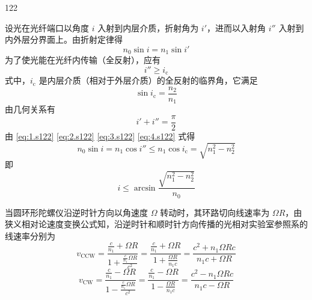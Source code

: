 \begin{solution}{122}
    \begin{subsolution}
        设光在光纤端口以角度 $i$ 入射到内层介质，折射角为 $i'$，进而以入射角 $i''$ 入射到内外层分界面上。由折射定律得
        \begin{equation}
            n_{0} \sin i = n_{1} \sin i'
            \label{eq:1.s122}
        \end{equation}
        为了使光能在光纤内传输（全反射），应有
        \begin{equation}
            i'' \geq i_{\mathrm{c}}
            \label{eq:2.s122}
        \end{equation}
        式中，$i_{\mathrm{c}}$ 是内层介质（相对于外层介质）的全反射的临界角，它满足
        \begin{equation}
            \sin i_{\mathrm{c}} = \frac{n_{2}}{n_{1}}
            \label{eq:3.s122}
        \end{equation}
        由几何关系有
        \begin{equation}
            i' + i'' = \frac{\pi}{2}
            \label{eq:4.s122}
        \end{equation}
        由 \eqref{eq:1.s122} \eqref{eq:2.s122} \eqref{eq:3.s122} \eqref{eq:4.s122} 式得
        \begin{equation}
            n_{0} \sin i = n_{1} \cos i'' \leq n_{1} \cos i_{\mathrm{c}} = \sqrt{n_{1}^{2} - n_{2}^{2}}
        \end{equation}
        即
        \begin{equation}
            i \leq \arcsin \frac{\sqrt{n_{1}^{2} - n_{2}^{2}}}{n_{0}}
            \label{eq:5.s122}
        \end{equation}
    \end{subsolution}
    \begin{subsolution}
        当圆环形陀螺仪沿逆时针方向以角速度 $\Omega$ 转动时，其环路切向线速率为 $\Omega R$，由狭义相对论速度变换公式知，沿逆时针和顺时针方向传播的光相对实验室参照系的线速率分别为
        \begin{equation}
            v_{\mathrm{CCW}} = \frac{\frac{c}{n_{1}} + \Omega R}{1 + \frac{\frac{c}{n_{1}} \Omega R}{c^{2}}} = \frac{\frac{c}{n_{1}} + \Omega R}{1 + \frac{\Omega R}{n_{1} c}} = \frac{c^{2} + n_{1} \Omega R c}{n_{1} c + \Omega R}
            \label{eq:6.s122}
        \end{equation}
        \begin{equation}
            v_{\mathrm{CW}} = \frac{\frac{c}{n_{1}} - \Omega R}{1 - \frac{\frac{c}{n_{1}} \Omega R}{c^{2}}} = \frac{\frac{c}{n_{1}} - \Omega R}{1 - \frac{\Omega R}{n_{1} c}} = \frac{c^{2} - n_{1} \Omega R c}{n_{1} c - \Omega R}

\end{equation}
\end{subsolution}
\end{solution}
